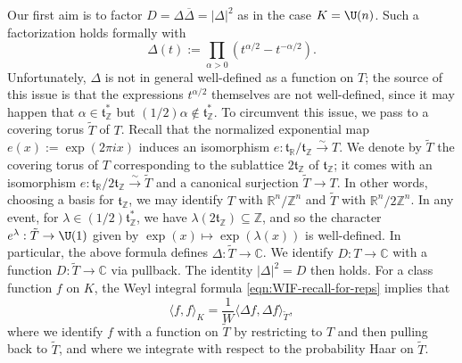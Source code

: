 \documentclass[reqno]{amsart} 
\begin{document}
Our first aim is to factor $D= \Delta \overline{\Delta } = |\Delta|^2$ as in the case $K = \U(n)$.  Such a factorization holds formally with
\begin{equation*}
  \Delta(t) :=
  \prod_{\alpha > 0}
  (t^{\alpha/2} - t^{-\alpha/2}).
\end{equation*}
Unfortunately, $\Delta$ is not in general well-defined as a function on $T$; the source of this issue is that the expressions $t^{\alpha/2}$ themselves are not well-defined, since it may happen that $\alpha \in \mathfrak{t}_{\mathbb{Z}}^*$ but $(1/2) \alpha \notin \mathfrak{t}_{\mathbb{Z}}^*$.  To circumvent this issue, we pass to a covering torus $\tilde{T}$ of $T$.  Recall that the normalized exponential map $e(x) := \exp(2 \pi i x)$ induces an isomorphism $e : \mathfrak{t}_{\mathbb{R}} / \mathfrak{t}_{\mathbb{Z}} \xrightarrow{\sim} T$.  We denote by $\tilde{T}$ the covering torus of $T$ corresponding to the sublattice $2 \mathfrak{t}_{\mathbb{Z}}$ of $\mathfrak{t}_{\mathbb{Z}}$; it comes with an isomorphism $e : \mathfrak{t}_{\mathbb{R}} / 2 \mathfrak{t}_{\mathbb{Z}} \xrightarrow{\sim} \tilde{T}$ and a canonical surjection $\tilde{T} \rightarrow T$.  In other words, choosing a basis for $\mathfrak{t}_{\mathbb{Z}}$, we may identify $T$ with $\mathbb{R}^n/\mathbb{Z}^n$ and $\tilde{T}$ with $\mathbb{R}^n/2 \mathbb{Z}^n$.  In any event, for $\lambda \in (1/2) \mathfrak{t}_{\mathbb{Z}}^*$, we have $\lambda(2 \mathfrak{t}_{\mathbb{Z}}) \subseteq \mathbb{Z}$, and so the character $e^{\lambda} : \tilde{T} \rightarrow \U(1)$ given by $\exp(x) \mapsto \exp(\lambda(x))$ is well-defined.  In particular, the above formula defines $\Delta : \tilde{T} \rightarrow \mathbb{C}$.  We identify $D : T \rightarrow \mathbb{C}$ with a function $D : \tilde{T} \rightarrow \mathbb{C}$ via pullback.  The identity $|\Delta|^2 = D$ then holds.  For a class function $f$ on $K$, the Weyl integral formula \eqref{eqn:WIF-recall-for-reps} implies that
\begin{equation*}
  \langle f, f \rangle_K
  =
  \frac{1}{W}
  \langle \Delta f, \Delta f \rangle_{\tilde{T}},
\end{equation*}
where we identify $f$ with a function on $\tilde{T}$ by restricting to $T$ and then pulling back to $\tilde{T}$, and where we integrate with respect to the probability Haar on $\tilde{T}$.
\end{document}
